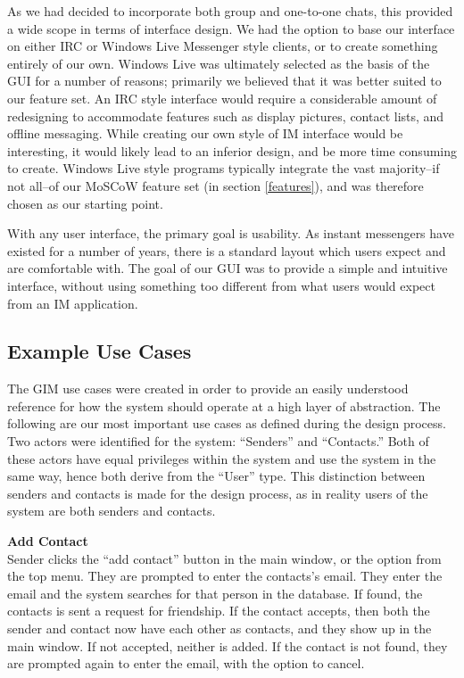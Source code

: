 As we had decided to incorporate both group and one-to-one chats, this provided a wide scope in terms of interface design. We had the option to base our interface on either IRC or Windows Live Messenger style clients, or to create something entirely of our own. Windows Live was ultimately selected as the basis of the GUI for a number of reasons; primarily we believed that it was better suited to our feature set. An IRC style interface would require a considerable amount of redesigning to accommodate features such as display pictures, contact lists, and offline messaging. While creating our own style of IM interface would be interesting, it would likely lead to an inferior design, and be more time consuming to create. Windows Live style programs typically integrate the vast majority--if not all--of our MoSCoW feature set (in section \ref{features}), and was therefore chosen as our starting point.

With any user interface, the primary goal is usability. As instant messengers have existed for a number of years, there is a standard layout which users expect and are comfortable with. The goal of our GUI was to provide a simple and intuitive interface, without using something too different from what users would expect from an IM application.
 
\subsection{Example Use Cases}

The GIM use cases were created in order to provide an easily understood reference for how the system should operate at a high layer of abstraction. The following are our most important use cases as defined during the design process. Two actors were identified for the system: ``Senders'' and ``Contacts.'' Both of these actors have equal privileges within the system and use the system in the same way, hence both derive from the ``User'' type. This distinction between senders and contacts is made for the design process, as in reality users of the system are both senders and contacts.

{\bf Add Contact}\\
Sender clicks the ``add contact'' button in the main window, or the option from the top menu. They are prompted to enter the contacts's email. They enter the email and the system searches for that person in the database. If found, the contacts is sent a request for friendship. If the contact accepts, then both the sender and contact now have each other as contacts, and they show up in the main window. If not accepted, neither is added. If the contact is not found, they are prompted again to enter the email, with the option to cancel.

